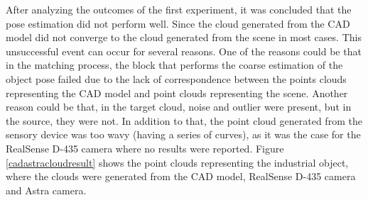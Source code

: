 After analyzing the outcomes of the first experiment, it was concluded that the pose estimation did not perform well. Since the cloud generated from the CAD model did not converge to the cloud generated from the scene in most cases. This unsuccessful event can occur for several reasons. One of the reasons could be that in the matching process, the block that performs the coarse estimation of the object pose failed due to the lack of correspondence between the points clouds representing the CAD model and point clouds representing the scene. Another reason could be that, in the target cloud, noise and outlier were present, but in the source, they were not. In addition to that, the point cloud generated from the sensory device was too wavy (having a series of curves), as it was the case for the RealSense D-435 camera where no results were reported. Figure \ref{cadastracloudresult} shows the point clouds representing the industrial object, where the clouds were generated from the CAD model, RealSense D-435 camera and Astra camera.\\


